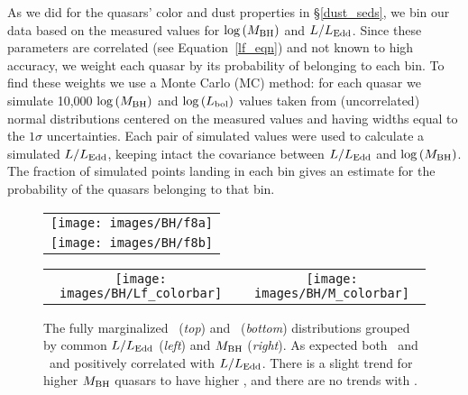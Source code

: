 As we did for the quasars' color and dust properties in \S\ref{dust_seds}, we bin our data based on the measured values for $\log{(M_{\rm BH})}$ and $\lf$.  Since these parameters are correlated  (see Equation~\ref{lf_eqn}) and not known to high accuracy, we weight each quasar by its probability of belonging to each bin.
To find these weights we use a Monte Carlo (MC) method: for each quasar we simulate 10,000 $\log{(M_{\rm BH})}$ and $\log{(L_{\rm bol})}$ values taken from (uncorrelated) normal distributions centered on the measured values and having widths equal to the $1\sigma$ uncertainties. Each pair of simulated values were used to calculate a simulated $\lf$, keeping intact the covariance between $\lf$ and $\log{(M_{\rm BH})}$.  The fraction of simulated points landing in each bin gives an estimate for the probability of the quasars belonging to that bin.

\begin{figure}[t]
\begin{center}
\begin{tabular}{c}
	\texttt{[image: images/BH/f8a]} \\
	\texttt{[image: images/BH/f8b]} 
\end{tabular}
\begin{tabular}{cc}
	\hspace{.4cm} \texttt{[image: images/BH/Lf\_colorbar]} & \hspace{.4cm} \texttt{[image: images/BH/M\_colorbar]}
\end{tabular}
\caption[\ltwofive\ and \bctwofive\ distributions grouped by $\mbh$ and $\lf$]{\label{L_BC_mbh_lf} The fully marginalized \ltwofive\ ({\em top}) and \bctwofive\ ({\em bottom}) distributions grouped by common $\lf$ ({\em left}) and $\mbh$ ({\em right}). As expected both \ltwofive\ and \bctwofive\ and positively correlated with $\lf$.  There is a slight trend for higher $\mbh$ quasars to have higher \ltwofive, and there are no trends with \bctwofive.
}
\end{center}
\end{figure}

